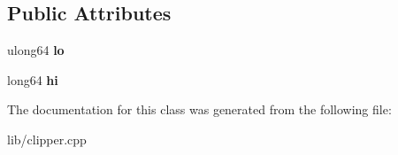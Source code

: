 \subsection*{Public Attributes}
\begin{DoxyCompactItemize}
\item 
\mbox{\label{class_clipper_lib_1_1_int128_a991b9da6e53c777a94fca640e505b258}} 
ulong64 {\bfseries lo}
\item 
\mbox{\label{class_clipper_lib_1_1_int128_a167643d0860a14fb563e055511e15e14}} 
long64 {\bfseries hi}
\end{DoxyCompactItemize}


The documentation for this class was generated from the following file\+:\begin{DoxyCompactItemize}
\item 
lib/clipper.\+cpp\end{DoxyCompactItemize}
